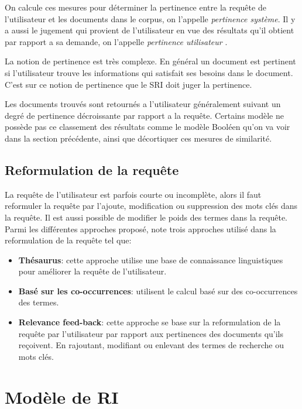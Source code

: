 On calcule ces mesures pour déterminer la pertinence entre la requête de l'utilisateur et les documents dans le corpus, on l'appelle \textit{pertinence système}. Il y a aussi le jugement qui provient de l'utilisateur en vue des résultats qu'il obtient par rapport a sa demande, on l'appelle \textit{pertinence utilisateur} \citep{vsm-images}.

La notion de pertinence est très complexe. En général un document est pertinent si l'utilisateur trouve les informations qui satisfait ses besoins dans le document. C'est sur ce notion de pertinence que le SRI doit juger la pertinence. \citep{salton1989automatique}

Les documents trouvés sont retournés a l’utilisateur généralement suivant un degré de pertinence décroissante par rapport a la requête. Certains modèle ne possède pas ce classement des résultats comme le modèle Booléen qu'on va voir dans la section précédente, ainsi que décortiquer ces mesures de similarité.

\subsection{Reformulation de la requête}
La requête de l'utilisateur est parfois courte ou incomplète, alors il faut reformuler la requête par l'ajoute, modification ou suppression des mots clés dans la requête. Il est aussi possible de modifier le poids des termes dans la requête. Parmi les différentes approches proposé, \citeauthor{amelioration-ri-approche-semantique} \citep{amelioration-ri-approche-semantique} note trois approches utilisé dans la reformulation de la requête tel que:

\begin{itemize}
    \item \textbf{Thésaurus}: cette approche utilise une base de connaissance linguistiques pour améliorer la requête de l’utilisateur.
    \item \textbf{Basé sur les co-occurrences}: utilisent le calcul basé sur des co-occurrences des termes.
    \item \textbf{Relevance feed-back}: cette approche se base sur la reformulation de la requête par l'utilisateur par rapport aux pertinences des documents qu'ils reçoivent. En rajoutant, modifiant ou enlevant des termes de recherche ou mots clés.
\end{itemize}

\section{Modèle de RI}
